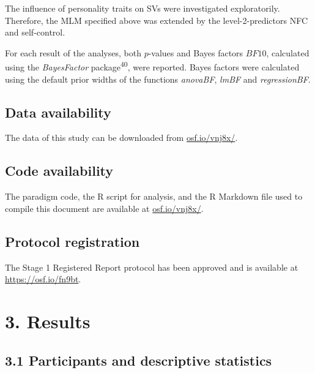 \documentclass[
  man,floatsintext]{apa6}
\begin{document}
The influence of personality traits on SVs were investigated exploratorily.
Therefore, the MLM specified above was extended by the level-2-predictors NFC and self-control.

For each result of the analyses, both \(p\)-values and Bayes factors \(BF10\), calculated using the \emph{BayesFactor} package\textsuperscript{40}, were reported.
Bayes factors were calculated using the default prior widths of the functions \emph{anovaBF}, \emph{lmBF} and \emph{regressionBF}.

\hypertarget{data-availability}{%
\subsection{Data availability}\label{data-availability}}

The data of this study can be downloaded from \href{https://osf.io/vnj8x/}{osf.io/vnj8x/}.

\hypertarget{code-availability}{%
\subsection{Code availability}\label{code-availability}}

The paradigm code, the R script for analysis, and the R Markdown file used to compile this document are available at \href{https://osf.io/vnj8x/}{osf.io/vnj8x/}.

\hypertarget{protocol-registration}{%
\subsection{Protocol registration}\label{protocol-registration}}

The Stage 1 Registered Report protocol has been approved and is available at \url{https://osf.io/fn9bt}.

\hypertarget{results}{%
\section{3. Results}\label{results}}

\hypertarget{participants-and-descriptive-statistics}{%
\subsection{3.1 Participants and descriptive statistics}\label{participants-and-descriptive-statistics}}
\end{document}
